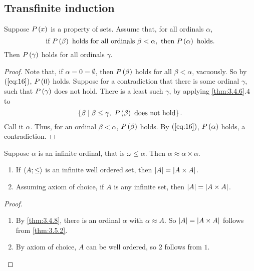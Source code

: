 \subsection{Transfinite induction}

\begin{theorem}
\label{thm:3.5.1}
Suppose $ P\left( x \right) $ is a property of sets. Assume that, for all ordinals $ \alpha $,
\begin{equation}
\label{eq:16}
\text{if} \ P\left( \beta \right) \ \text{holds for all ordinals} \ \beta < \alpha, \ \text{then} \ P\left( \alpha \right) \ \text{holds}.
\end{equation}
Then $ P\left( \gamma \right) $ holds for all ordinals $ \gamma $.
\end{theorem}

\begin{proof}
Note that, if $ \alpha = 0 = \emptyset $, then $ P\left( \beta \right) $ holds for all $ \beta < \alpha $, vacuously. So by $ \left( \ref{eq:16} \right) $, $ P\left( 0 \right) $ holds. Suppose for a contradiction that there is some ordinal $ \gamma $, such that $ P\left( \gamma \right) $ does not hold. There is a least such $ \gamma $, by applying \ref{thm:3.4.6}.$ 4 $ to
$$ \cb{\beta \mid \beta \le \gamma, \ P\rb{\beta} \ \text{does not hold}}. $$
Call it $ \alpha $. Thus, for an ordinal $ \beta < \alpha $, $ P\left( \beta \right) $ holds. By $ \left( \ref{eq:16} \right) $, $ P\left( \alpha \right) $ holds, a contradiction.
\end{proof}

\pagebreak

\begin{theorem}
\label{thm:3.5.2}
Suppose $ \alpha $ is an infinite ordinal, that is $ \omega \le \alpha $. Then $ \alpha \approx \alpha \times \alpha $.
\end{theorem}

\begin{corollary}
\label{cor:3.5.3}
\hfill
\begin{enumerate}
\item If $ \left\langle A; \le \right\rangle $ is an infinite well ordered set, then $ \left\lvert A \right\rvert = \left\lvert A \times A \right\rvert $.
\item Assuming axiom of choice, if $ A $ is any infinite set, then $ \left\lvert A \right\rvert = \left\lvert A \times A \right\rvert $.
\end{enumerate}
\end{corollary}

\begin{proof}
\hfill
\begin{enumerate}
\item By \ref{thm:3.4.8}, there is an ordinal $ \alpha $ with $ \alpha \approx A $. So $ \left\lvert A \right\rvert = \left\lvert A \times A \right\rvert $ follows from \ref{thm:3.5.2}.
\item By axiom of choice, $ A $ can be well ordered, so $ 2 $ follows from $ 1 $.
\end{enumerate}
\end{proof}

